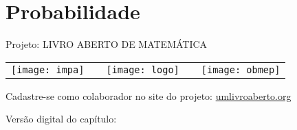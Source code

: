 \ifnum{}
\renewcommand\chapterillustration{abertura-probabilidade.jpg}
\else
\renewcommand\chapterillustration{abertura-probabilidade-professor.jpg}
\fi
\renewcommand\chapterwhat{Reconhecimento de fenômenos determinísticos e aleatórios. Interpretações de probabilidade: clássica, frequentista e subjetiva. Conceitos básicos. Definição matemática deprobabilidade.
Propriedades da probabilidade. Probabilidade condicional. Inde-
pendência.}
\renewcommand\chapterbecause{Porque grande parte das decisões científicas de nossa era se dá em ambiente de incerteza e a Teoria das Probabilidades é a área da matemática que fornece estruturas para a quantificação da aleatoriedade associada a determinados fenômenos de interesse, para uma tomada de decisão adequada sob incerteza.}

\makeatletter
\ifnum{}
\else
\renewcommand*{\toclevel@section}{1}
\renewcommand*{\toclevel@subsection}{4}
\renewcommand*{\toclevel@paragraph}{5}
\renewcommand*{\toclevel@subparagraph}{6}

\renewcommand*{\toclevel@exploresec}{2}
\renewcommand*{\toclevel@practicesec}{2}
\renewcommand*{\toclevel@arrangesec}{2}
\renewcommand*{\toclevel@knowsec}{1}
\renewcommand*{\toclevel@exercisesec}{1}

\setcounter{tocdepth}{2}
\fi
\makeatother

\chapter{Probabilidade}
\ifdefined\estchapum
\else
\label{est1-chap}
\fi

\ifdefined\estchapdois
\else
\label{est2-chap}
\fi


\mbox{}\thispagestyle{empty}\clearpage

\thispagestyle{empty}

\begin{center}
Projeto: LIVRO ABERTO DE MATEMÁTICA

\noindent \begin{tabular}{lcccr}
\texttt{[image: impa]}& \quad\quad& \texttt{[image: logo]} & \quad\quad& \texttt{[image: obmep]} 
\end{tabular}
\end{center}

\vspace*{.3cm}

Cadastre-se como colaborador no site do projeto: \url{umlivroaberto.org}

Versão digital do capítulo:


